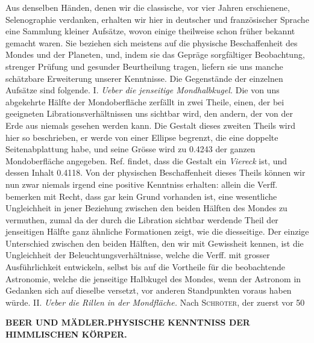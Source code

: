 Aus denselben Händen, denen wir die classische, vor vier Jahren erschienene, Selenographie verdanken, erhalten wir hier in deutscher und französischer Sprache eine Sammlung kleiner Aufsätze, wovon einige theilweise schon früher bekannt gemacht waren. Sie beziehen sich meistens auf die physische Beschaffenheit des Mondes und der Planeten, und, indem sie das Gepräge sorgfältiger Beobachtung, strenger Prüfung und gesunder Beurtheilung tragen, liefern sie uns manche schätzbare Erweiterung unserer Kenntnisse. Die Gegenstände der einzelnen Aufsätze sind folgende. I. \emph{Ueber die jenseitige Mondhalbkugel.} Die von uns abgekehrte Hälfte der Mondoberfläche zerfällt in zwei Theile, einen, der bei geeigneten Librationsverhältnissen uns sichtbar wird, den andern, der von der Erde aus niemals gesehen werden kann. Die Gestalt dieses zweiten Theils wird hier so beschrieben, er werde von einer Ellipse begrenzt, die eine doppelte Seitenabplattung habe, und seine Grösse wird zu 0.4243 der ganzen Mondoberfläche angegeben. Ref. findet, dass die Gestalt ein \emph{Viereck} ist, und dessen Inhalt 0.4118. Von der physischen Beschaffenheit dieses Theils können wir nun zwar niemals irgend eine positive Kenntniss erhalten: allein die Verff. bemerken mit Recht, dass gar kein Grund vorhanden ist, eine wesentliche Ungleichheit in jener Beziehung zwischen den beiden Hälften des Mondes zu vermuthen, zumal da der durch die Libration sichtbar werdende Theil der jenseitigen Hälfte ganz ähnliche Formationen zeigt, wie die diesseitige. Der einzige Unterschied zwischen den beiden Hälften, den wir mit Gewissheit kennen, ist die Ungleichheit der Beleuchtungsverhältnisse, welche die Verff. mit grosser Ausführlichkeit entwickeln, selbst bis auf die Vortheile für die beobachtende Astronomie, welche die jenseitige Halbkugel des Mondes, wenn der Astronom in Gedanken sich auf dieselbe versetzt, vor anderen Standpunkten voraus haben würde. II. \emph{Ueber die Rillen in der Mondfläche.} Nach \textsc{Schröter}, der zuerst vor 50\par
\clearpage
\thispagestyle{empty}
\noindent{}%
\makebox[12mm][l]{}%
\parbox[t]{\dimexpr\linewidth-24mm\relax}{\centering\fontsize{8}{10}\selectfont\bfseries BEER UND MÄDLER.\enspace PHYSISCHE KENNTNISS DER HIMMLISCHEN KÖRPER.}%
\par\medskip
